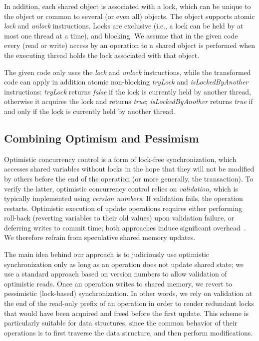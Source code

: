 In addition, each shared object is associated with a lock, which can be unique to the object or common to several (or even all) objects. 
The object supports atomic \emph{lock} and \emph{unlock} instructions.
Locks are exclusive (i.e., a lock can be held by at most one thread at a time), and blocking.
We assume that in the given code every (read
or write) access by an operation to a shared object is performed when the
executing thread holds the lock associated with that object.


The given code only uses the \emph{lock} and \emph{unlock} instructions, while the transformed code can apply in addition atomic non-blocking
\emph{tryLock}  and \emph{isLockedByAnother} instructions: 
 \emph{tryLock}  returns \emph{false} if the lock is currently held by another thread, otherwise it acquires the lock and returns \emph{true};
 \emph{isLockedByAnother}  returns \emph{true} if and only if the lock is currently held by another thread.


\subsection{Combining Optimism and Pessimism}\label{ssec:overview}

Optimistic concurrency control is a form of lock-free synchronization, which accesses shared variables without locks in the hope that they will not be modified by others before the end of the operation (or more generally, the transaction). To verify the latter, optimistic concurrency control relies on \emph{validation}, which is typically implemented using \emph{version numbers}. If validation fails, the operation restarts. Optimistic execution of update operations requires either performing roll-back (reverting variables to their old values) upon validation failure, or deferring writes to commit time; both approaches induce significant overhead~\cite{Cascaval:2008}. We therefore refrain from speculative shared memory updates.

The main idea behind our approach is to judiciously use optimistic synchronization only as long as an operation does not update shared state;
we use a standard approach based on version numbers to allow validation of optimistic reads.
Once an operation
writes to shared memory, we revert to pessimistic (lock-based) synchronization. In
other words, we rely on validation at the end of the read-only prefix of an operation in order to render redundant
locks that would have been acquired and freed before the first update.
This scheme is particularly suitable for data structures,
since the common behavior of their operations
is to first traverse the data structure, and then
perform modifications.

